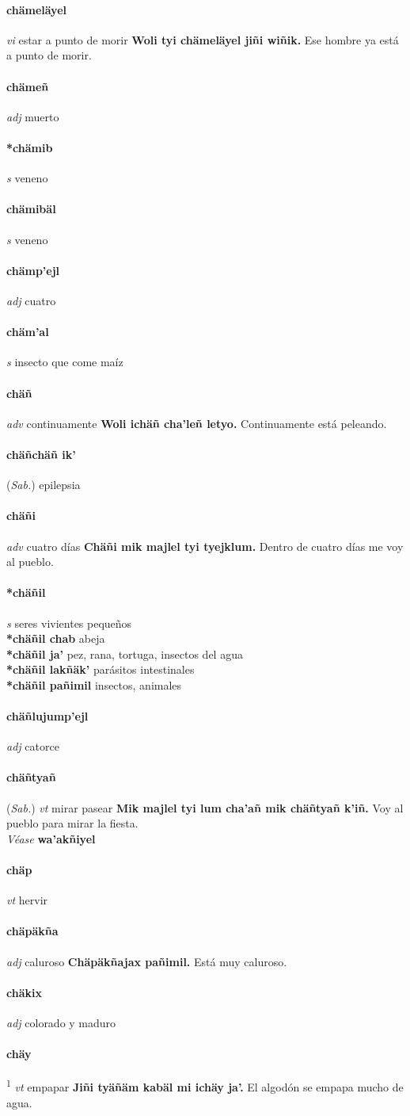 \documentclass{scrbook}
\newcommand{\entry}[1]{\paragraph{#1}}
\newcommand{\defsuperscript}[1]{\textsuperscript{1}}
\newcommand{\partofspeech}[1]{\textit{#1}}
\newcommand{\spanishtranslation}[1]{#1}
\newcommand{\cholexample}[1]{\textbf{#1}}
\newcommand{\exampletranslation}[1]{#1}
\newcommand{\alsosee}[1]{\\\textit{Véase} \textbf{#1}}
\newcommand{\relevantdialect}[1]{(\textit{#1})}
\newcommand{\secondaryentry}[1]{\\\textbf{#1}}
\newcommand{\secondtranslation}[1]{#1}
\begin{document}
\begin{multicols}{2}
\entry{chämeläyel}
\partofspeech{vi}
\spanishtranslation{estar a punto de morir}
\cholexample{Woli tyi chämeläyel jiñi wiñik.}
\exampletranslation{Ese hombre ya está a punto de morir.}

\entry{chämeñ}
\partofspeech{adj}
\spanishtranslation{muerto}

\entry{*chämib}
\partofspeech{s}
\spanishtranslation{veneno}

\entry{chämibäl}
\partofspeech{s}
\spanishtranslation{veneno}

\entry{chämp'ejl}
\partofspeech{adj}
\spanishtranslation{cuatro}

\entry{chäm'al}
\partofspeech{s}
\spanishtranslation{insecto que come maíz}

\entry{chäñ}
\partofspeech{adv}
\spanishtranslation{continuamente}
\cholexample{Woli ichäñ cha'leñ letyo.}
\exampletranslation{Continuamente está peleando.}

\entry{chäñchäñ ik'}
\relevantdialect{Sab.}
\spanishtranslation{epilepsia}

\entry{chäñi}
\partofspeech{adv}
\spanishtranslation{cuatro días}
\cholexample{Chäñi mik majlel tyi tyejklum.}
\exampletranslation{Dentro de cuatro días me voy al pueblo.}

\entry{*chäñil}
\partofspeech{s}
\spanishtranslation{seres vivientes pequeños}
\secondaryentry{*chäñil chab}
\secondtranslation{abeja}
\secondaryentry{*chäñil ja'}
\secondtranslation{pez, rana, tortuga, insectos del agua}
\secondaryentry{*chäñil lakñäk'}
\secondtranslation{parásitos intestinales}
\secondaryentry{*chäñil pañimil}
\secondtranslation{insectos, animales}

\entry{chäñlujump'ejl}
\partofspeech{adj}
\spanishtranslation{catorce}

\entry{chäñtyañ}
\relevantdialect{Sab.}
\partofspeech{vt}
\spanishtranslation{mirar}
\spanishtranslation{pasear}
\cholexample{Mik majlel tyi lum cha'añ mik chäñtyañ k'iñ.}
\exampletranslation{Voy al pueblo para mirar la fiesta.}
\alsosee{wa'akñiyel}

\entry{chäp}
\partofspeech{vt}
\spanishtranslation{hervir}

\entry{chäpäkña}
\partofspeech{adj}
\spanishtranslation{caluroso}
\cholexample{Chäpäkñajax pañimil.}
\exampletranslation{Está muy caluroso.}

\entry{chäkix}
\partofspeech{adj}
\spanishtranslation{colorado y maduro}

\entry{chäy}
\defsuperscript{1}
\partofspeech{vt}
\spanishtranslation{empapar}
\cholexample{Jiñi tyäñäm kabäl mi ichäy ja'.}
\exampletranslation{El algodón se empapa mucho de agua.}


\end{multicols}
\end{document}
